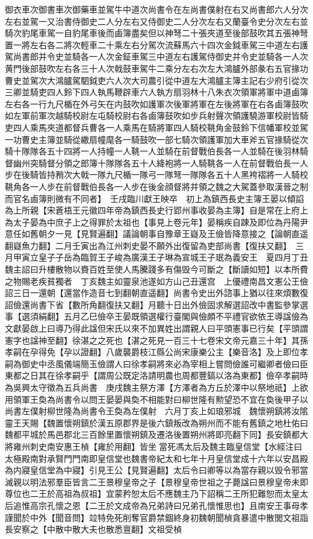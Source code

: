 御衣車次御書車次御藥車並駕牛中道次尚書令在左尚書僕射在右又尚書郎六人分次左右並駕一又治書侍御史二人分左右又侍御史二人分次左右又蘭臺令史分次左右並騎次豹尾車駕一自豹尾車後而鹵簿盡矣但以神弩二十張夾道至後部鼓吹其五張神弩置一將左右各二將次輕車二十乘左右分駕次流蘇馬六十四次金鉞車駕三中道左右護駕尚書郎并令史並騎各一人次金鉦車駕三中道左右護駕侍御史并令史並騎各一人次黄門後部鼓吹左右各三十人次戟鼓車駕牛二乘分左右次左大鴻臚外部彖右五官掾功曹史並駕次大鴻臚駕駟鉞吏六人次大司農引從中道左大鴻臚主簿主記右少府引從次三卿並騎吏四人鈴下四人執馬鞭辟車六人執方扇羽林十八朱衣次領軍將軍中道鹵簿左右各一行九尺楯在外弓矢在内鼓吹如護軍次後軍將軍在左後將軍在右各鹵簿鼓吹如左軍前軍次越騎校尉左屯騎校尉右各鹵簿鼓吹如步兵射聲次領護驍游軍校尉皆騎吏四人乘馬夾道都督兵曹各一人乘馬在騎將軍四人騎校鞉角金鼓鈴下信幡軍校並駕一功曹史主簿並騎從繖扇幢麾各一騎鼓吹一部七騎次領護軍加大車斧五官掾騎從次騎十隊隊各五十四將一人持幢一人鞉一人並騎在前督戰伯長各一人並騎在後羽林騎督幽州突騎督分領之郎簿十隊隊各五十人絳袍將一人騎鞉各一人在前督戰伯長一人步在後騎皆持矟次大戟一隊九尺楯一隊弓一隊弩一隊隊各五十人黑袴褶將一人騎校鞉角各一人步在前督戰伯長各一人步在後金顔督將并領之魏之大駕蓋參取漢晉之制而官名鹵簿則微有不同者】　壬戌臨川獻王映卒　初上為鎮西長史主簿王晏以傾諂為上所親【宋蒼梧王元徽四年帝為鎮西長史行郢州事收晏為主簿】自是常在上府上為太子晏為中庶子上之得罪於太祖也【事見上卷元年】晏稱疾自踈及即位為丹陽尹意任如舊朝夕一見【見賢遍翻】議論朝事自豫章王嶷及王儉皆降意接之【論朝直遥翻嶷魚力翻】二月壬寅出為江州刺史晏不願外出復留為吏部尚書【復扶又翻】　三月甲寅立皇子子岳為臨賀王子峻為廣漢王子琳為宣城王子珉為義安王　夏四月丁丑魏主詔曰升樓散物以賚百姓至使人馬騰踐多有傷毁今可斷之【斷讀如短】以本所費之物賜老疾貧獨者　丁亥魏主如靈泉池遂如方山己丑還宫　上優禮南昌文憲公王儉詔三日一還朝【還當作造音七到翻朝直遥翻】尚書令史出外諮事上猶以往來煩數復詔儉還尚書下省【數所角翻復扶又翻】月聽十日出外儉固求解選詔改中書監參掌選事【選須絹翻】五月乙巳儉卒王晏既領選權行臺閣與儉頗不平禮官欲依王導諡儉為文獻晏啟上曰導乃得此諡但宋氏以來不加異姓出謂親人曰平頭憲事已行矣【平頭謂憲字也諡神至翻】徐湛之之死也【湛之死見一百三十七卷宋文帝元嘉三十年】其孫孝嗣在孕得免【孕以證翻】八歲襲爵枝江縣公尚宋康樂公主【樂音洛】及上即位孝嗣為御史中丞風儀端簡玉儉謂人曰徐孝嗣將來必為宰相上嘗問儉誰可繼卿者儉曰臣東都之日其在徐孝嗣乎【謂周公既定洛請明農也周都豐鎬以洛為東都】儉卒孝嗣時為吳興太守徵為五兵尚書　庚戌魏主祭方澤【方澤者為方丘於澤中以祭地祇】上欲用領軍王奐為尚書令以問王晏晏與奐不相能對曰柳世隆有勲望恐不宜在奐後甲子以尚書左僕射柳世隆為尚書令王奐為左僕射　六月丁亥上如琅邪城　魏懷朔鎮將汝隂靈王天賜【魏置懷朔鎮於漢五原郡界是後六鎮叛改為朔州而不能有舊鎮之地杜佑曰魏都平城於馬邑郡北三百餘里置懷朔鎮及遷洛後置朔州將即亮翻下同】長安鎮都大將雍州刺史南安惠王楨【雍於用翻】皆坐當死馮太后及魏主臨皇信堂【水經注曰太極殿南對承賢門門南即皇信堂也魏書帝紀太和七年十月皇信堂成十六年以安昌殿為内寢皇信堂為中寢】引見王公【見賢遍翻】太后令曰卿等以為當存親以毁令邪當滅親以明法邪羣臣皆言二王景穆皇帝之子【景穆皇帝世祖之子薨諡曰景穆皇帝未即尊位也二王於高祖為叔祖】宜蒙矜恕太后不應魏主乃下詔稱二王所犯難恕而太皇太后追惟高宗孔懷之恩【二王於文成帝為兄弟詩曰兄弟孔懷惟思也】且南安王事母孝謹聞於中外【聞音問】竝特免死削奪官爵禁錮終身初魏朝聞楨貪暴遣中散閭文祖詣長安察之【中散中散大夫也散悉亶翻】文祖受楨